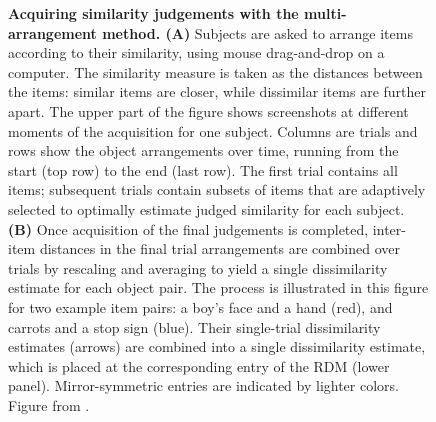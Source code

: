 \documentclass[
  authoryear]{elsarticle}
\begin{document}
\begin{figure}


\caption{\label{fig-multi-arrangement}\textbf{Acquiring similarity
judgements with the multi-arrangement method. (A)} Subjects are asked to
arrange items according to their similarity, using mouse drag-and-drop
on a computer. The similarity measure is taken as the distances between
the items: similar items are closer, while dissimilar items are further
apart. The upper part of the figure shows screenshots at different
moments of the acquisition for one subject. Columns are trials and rows
show the object arrangements over time, running from the start (top row)
to the end (last row). The first trial contains all items; subsequent
trials contain subsets of items that are adaptively selected to
optimally estimate judged similarity for each subject. \textbf{(B)} Once
acquisition of the final judgements is completed, inter-item distances
in the final trial arrangements are combined over trials by rescaling
and averaging to yield a single dissimilarity estimate for each object
pair. The process is illustrated in this figure for two example item
pairs: a boy's face and a hand (red), and carrots and a stop sign
(blue). Their single-trial dissimilarity estimates (arrows) are combined
into a single dissimilarity estimate, which is placed at the
corresponding entry of the RDM (lower panel). Mirror-symmetric entries
are indicated by lighter colors. Figure from
\citet{murHumanObjectSimilarityJudgments2013}.}

\end{figure}%
\end{document}
